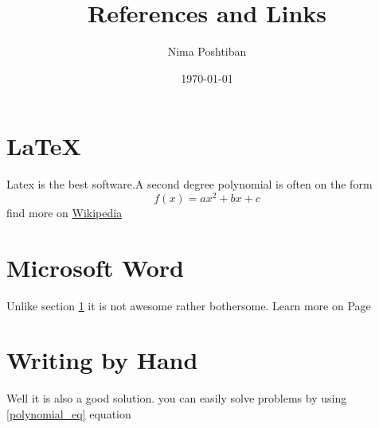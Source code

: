 \documentclass{article}
\author{Nima Poshtiban}
\date{\today}
\title{References and Links}
\begin{document}
\maketitle
\tableofcontents
\section{LaTeX}\label{latex-sec} %
Latex is the best software.\newline A second degree
polynomial is often on the form 
\begin{equation}
\label{polynomial_eq}
	f(x) = ax^{2} + bx + c
\end{equation}
find more on \href{https://en.wikipedia.org/wiki/Quadratic_equation}{Wikipedia} %
\newpage

\section{Microsoft Word}
Unlike section \ref{latex-sec} it is not awesome rather bothersome. 
Learn more on Page \pageref{latex-sec} %
\newpage
\section{Writing by Hand}
Well it is also a good solution.
you can easily solve problems by using \eqref{polynomial_eq}  equation %
\end{document}
